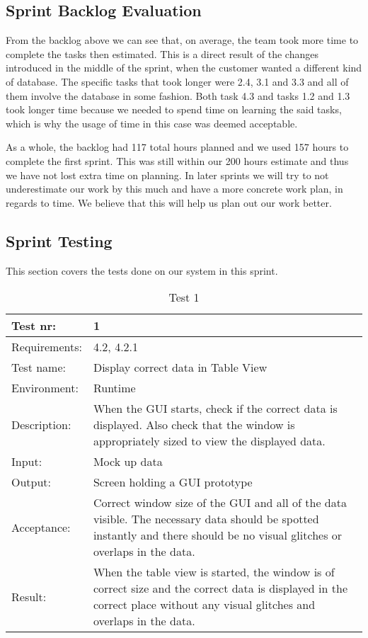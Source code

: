 \documentclass[../document.tex]{subfiles}
\begin{document}
\subsection{Sprint Backlog Evaluation}
From the backlog above we can see that, on average, the team took more time to complete the tasks then estimated. This is a direct result of the changes introduced in the middle of the sprint, when the customer wanted a different kind of database. The specific tasks that took longer were 2.4, 3.1 and 3.3 and all of them involve the database in some fashion. Both task 4.3 and tasks 1.2 and 1.3 took longer time because we needed to spend time on learning the said tasks, which is why the usage of time in this case was deemed acceptable.

As a whole, the backlog had 117 total hours planned and we used 157 hours to complete the first sprint. This was still within our 200 hours estimate and thus we have not lost extra time on planning. In later sprints we will try to not underestimate our work by this much and have a more concrete work plan, in regards to time. We believe that this will help us plan out our work better.

\subsection{Sprint Testing}

This section covers the tests done on our system in this sprint.

\begin{table}[H]
\caption{Test 1}
\begin{tabularx}{\textwidth}{|l|X|}
\hline
Test nr:
&1
\\ \hline Requirements:
&4.2, 4.2.1
\\ \hline Test name:
&Display correct data in Table View
\\ \hline Environment:
&Runtime
\\ \hline Description:
&When the GUI starts, check if the correct data is displayed. Also check that the window is appropriately sized to view the displayed data.
\\ \hline Input:
&Mock up data
\\ \hline Output:
&Screen holding a GUI prototype
\\ \hline Acceptance:
&Correct window size of the GUI and all of the data visible. The necessary data should be spotted instantly and there should be no visual glitches or overlaps in the data.
\\ \hline Result:
&When the table view is started, the window is of correct size and the correct data is displayed in the correct place without any visual glitches and overlaps in the data.
\\ \hline
\end{tabularx}
\end{table}
\end{document}
